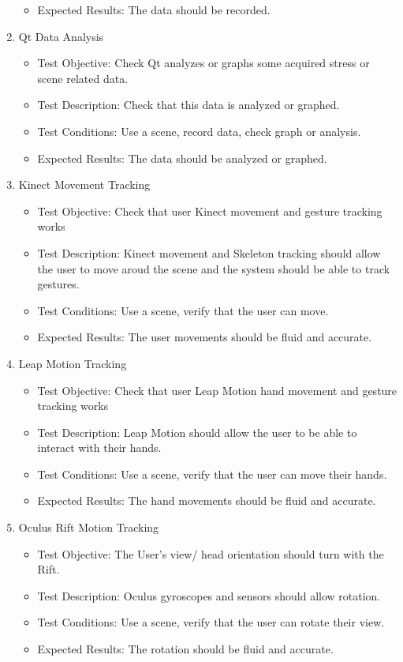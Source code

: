 \documentclass[a4paper,10pt]{article}
\begin{document}
\begin{enumerate}
\begin{itemize}
	\item Expected Results: The data should  be recorded.
    \end{itemize}
    \item  Qt Data Analysis
    \begin{itemize}
	\item Test Objective: Check Qt analyzes or graphs some acquired stress or scene related data.
	\item Test Description: Check that this data is analyzed or graphed.
	\item Test Conditions: Use a scene, record data, check graph or analysis.
	\item Expected Results: The data should  be analyzed or graphed.
    \end{itemize}
    \item Kinect Movement Tracking
    \begin{itemize}
	\item Test Objective: Check that user Kinect movement and gesture tracking works
	\item Test Description: Kinect movement and Skeleton tracking should allow the user to move aroud the scene and the system should be able to track gestures.
	\item Test Conditions: Use a scene, verify that the user can move.
	\item Expected Results: The user movements should be fluid and accurate.
    \end{itemize}
    \item Leap Motion Tracking
    \begin{itemize}
	\item Test Objective: Check that user Leap Motion hand movement and gesture tracking works
	\item Test Description: Leap Motion should allow the user to be able to interact with their hands.
	\item Test Conditions: Use a scene, verify that the user can move their hands.
	\item Expected Results: The hand movements should be fluid and accurate.
    \end{itemize}
    \item Oculus Rift Motion Tracking
    \begin{itemize}
	\item Test Objective: The User's view/ head orientation should turn with the Rift.
	\item Test Description: Oculus gyroscopes and sensors should allow rotation.
	\item Test Conditions: Use a scene, verify that the user can rotate their view.
	\item Expected Results: The rotation should be fluid and accurate.
    \end{itemize}
    
\end{enumerate}
\end{document}
